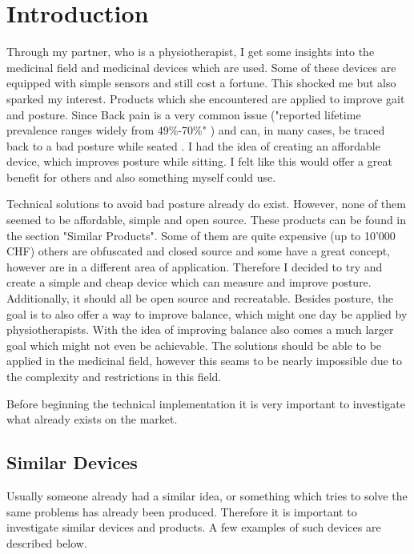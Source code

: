 \chapter*{Introduction}
\label{chap:Introduction}
\renewcommand{\thesection}{\arabic{section}}
\setcounter{section}{0}

Through my partner, who is a physiotherapist, I get some insights into the medicinal field and medicinal devices which are used. Some of these devices are equipped with simple sensors and still cost a fortune. This shocked me but also sparked my interest. Products which she encountered are applied to improve gait and posture. Since Back pain is a very common issue ("reported lifetime prevalence ranges widely from 49\%-70\%" \cite{backpain00:study}) and can, in many cases, be traced back to a bad posture while seated \cite{sitting00:study}. I had the idea of creating an affordable device, which improves posture while sitting. I felt like this would offer a great benefit for others and also something myself could use.

Technical solutions to avoid bad posture already do exist. However, none of them seemed to be affordable, simple and open source. These products can be found in the section "Similar Products". Some of them are quite expensive (up to 10'000 CHF) others are obfuscated and closed source and some have a great concept, however are in a different area of application. Therefore I decided to try and create a simple and cheap device which can measure and improve posture. Additionally, it should all be open source and recreatable. Besides posture, the goal is to also offer a way to improve balance, which might one day be applied by physiotherapists.
With the idea of improving balance also comes a much larger goal which might not even be achievable. The solutions should be able to be applied in the medicinal field, however this seams to be nearly impossible due to the complexity and restrictions in this field. 

Before beginning the technical implementation it is very important to investigate what already exists on the market.



\section{Similar Devices}


Usually someone already had a similar idea, or something which tries to solve the same problems has already been produced. Therefore it is important to investigate similar devices and products. A few examples of such devices are described below.

